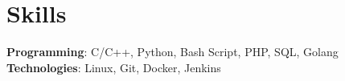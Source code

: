 \documentclass[A4,11pt]{article}
\begin{document}
\section{Skills}
 \begin{itemize}[leftmargin=0.5cm, label={}]
    \small{\item{
      \textbf{Programming}{: C/C++, Python, Bash Script, PHP, SQL, Golang} \\
      \textbf{Technologies}{: Linux, Git, Docker, Jenkins} \\
    }}
 \end{itemize}
    
\end{document}
